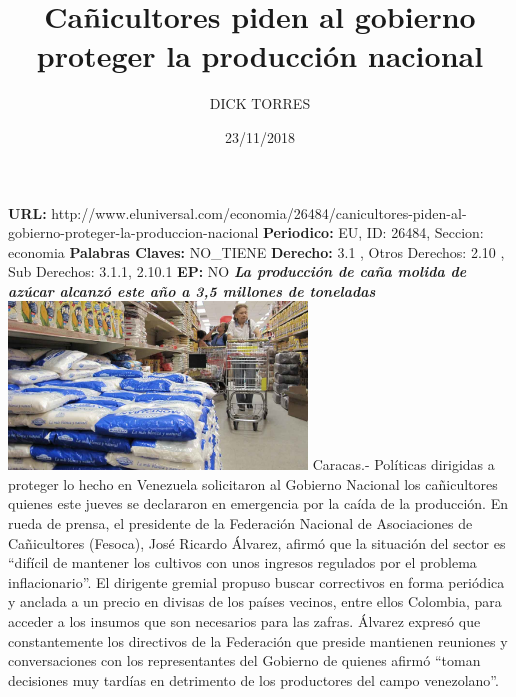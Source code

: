 \documentclass{article}%
\title{\textbf{Cañicultores piden al gobierno proteger la producción nacional}}%
\author{DICK TORRES}%
\date{23/11/2018}%
\begin{document}
%
\normalsize%
\maketitle%
\textbf{URL: }%
http://www.eluniversal.com/economia/26484/canicultores{-}piden{-}al{-}gobierno{-}proteger{-}la{-}produccion{-}nacional\newline%
%
\textbf{Periodico: }%
EU, %
ID: %
26484, %
Seccion: %
economia\newline%
%
\textbf{Palabras Claves: }%
NO\_TIENE\newline%
%
\textbf{Derecho: }%
3.1%
, Otros Derechos: %
2.10%
, Sub Derechos: %
3.1.1, 2.10.1%
\newline%
%
\textbf{EP: }%
NO\newline%
\newline%
%
\textbf{\textit{La producción de caña molida de azúcar alcanzó este año a 3,5 millones de toneladas}}%
\newline%
\newline%
%
\includegraphics[width=300px]{244.jpg}%
\newline%
%
Caracas.{-} Políticas dirigidas a proteger lo hecho en Venezuela solicitaron al Gobierno Nacional los cañicultores quienes este jueves se declararon en emergencia por la caída de la producción.%
\newline%
%
En rueda de prensa, el presidente de la Federación Nacional de Asociaciones de Cañicultores (Fesoca), José Ricardo Álvarez, afirmó que la situación del sector es “difícil de mantener los cultivos con unos ingresos regulados por el problema inflacionario”.%
\newline%
%
El dirigente gremial propuso buscar correctivos en forma periódica y anclada a un precio en divisas de los países vecinos, entre ellos Colombia, para acceder a los insumos que son necesarios para las zafras.%
\newline%
%
Álvarez expresó que constantemente los directivos de la Federación que preside mantienen reuniones y conversaciones con los representantes del Gobierno de quienes afirmó “toman decisiones muy tardías en detrimento de los productores del campo venezolano”.%
\end{document}
